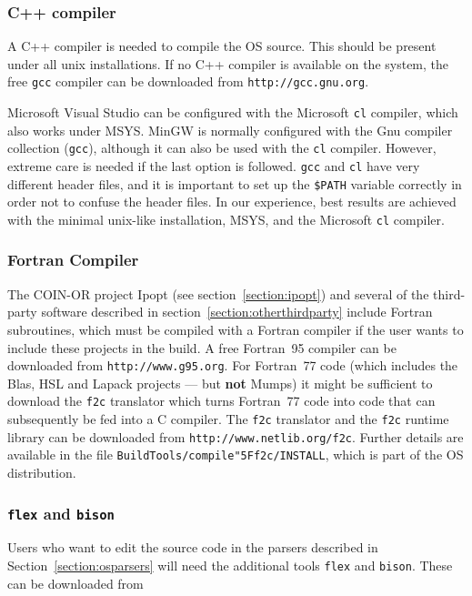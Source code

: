\documentclass[11pt]{article}
\renewcommand{\_}{{\char"5F}}
\renewcommand{\{}{{\char"7B}}
\renewcommand{\}}{{\char"7D}}
\renewcommand{\^}{{\char"0D}}
\renewcommand{\'}{{\char"0D}}
\newcommand{\UrlFToC}{http://www.netlib.org/f2c}
\newcommand{\UrlGgs}{http://www.g95.org}
\newcommand{\UrlGcc}{http://gcc.gnu.org}
\begin{document}
\subsubsection{C++ compiler}\label{section:cpp}
A C++ compiler is needed to compile the OS source. This should be present 
under all unix installations. If no C++ compiler is available on the system, the free {\tt gcc} 
compiler can be downloaded from {\tt\UrlGcc}.

Microsoft Visual Studio can be configured with the Microsoft {\tt cl} compiler, 
which also works under MSYS. MinGW is normally configured with the Gnu compiler collection 
({\tt gcc}), although it can also be used with the {\tt cl} compiler. However, extreme care is needed if the last 
option is followed. {\tt gcc} and {\tt cl} have very different header files, and it is important to set up the 
{\tt \$PATH} variable correctly in order not to confuse the header files. 
In our experience, best results are achieved with the minimal unix-like installation, MSYS, and the 
Microsoft {\tt cl} compiler.

\subsubsection{Fortran Compiler}\label{section:fortran}
The COIN-OR project Ipopt (see section~\ref{section:ipopt}) and several of 
the third-party software described in section~\ref{section:otherthirdparty} include Fortran subroutines, 
which must be compiled with a Fortran compiler if the user wants to include these projects in the build. A free 
Fortran~95 compiler
can be downloaded from {\tt\UrlGgs}. For Fortran~77 code (which includes the Blas,
HSL and Lapack projects --- but {\bf not} Mumps) 
it might be sufficient to download the {\tt f2c} translator
which turns Fortran~77 code into code that can subsequently be fed into a C compiler.
The {\tt f2c} translator and the {\tt f2c} runtime library can be downloaded from {\tt\UrlFToC}.
Further details are available in the file {\tt BuildTools/compile\_f2c/INSTALL}, which is part of the OS distribution.

\subsubsection{{\tt flex} and {\tt bison} }\label{section:flex}
Users who want to edit the source code in the parsers described in
Section~\ref{section:osparsers} will need the additional  tools
{\tt flex} and {\tt bison}.  These can be downloaded from
\end{document}
